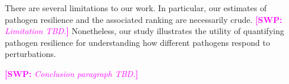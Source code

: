 \documentclass[12pt]{article}
\newcommand{\comment}{\showcomment}
\newcommand{\showcomment}[3]{\textcolor{#1}{\textbf{[#2: }\textsl{#3}\textbf{]}}}
\newcommand{\swp}[1]{\comment{magenta}{SWP}{#1}}
\begin{document}
There are several limitations to our work.
In particular, our estimates of pathogen resilience and the associated ranking are necessarily crude.
\swp{Limitation TBD.}
Nonetheless, our study illustrates the utility of quantifying pathogen resilience for understanding how different pathogens respond to perturbations.

\swp{Conclusion paragraph TBD.}
\end{document}
